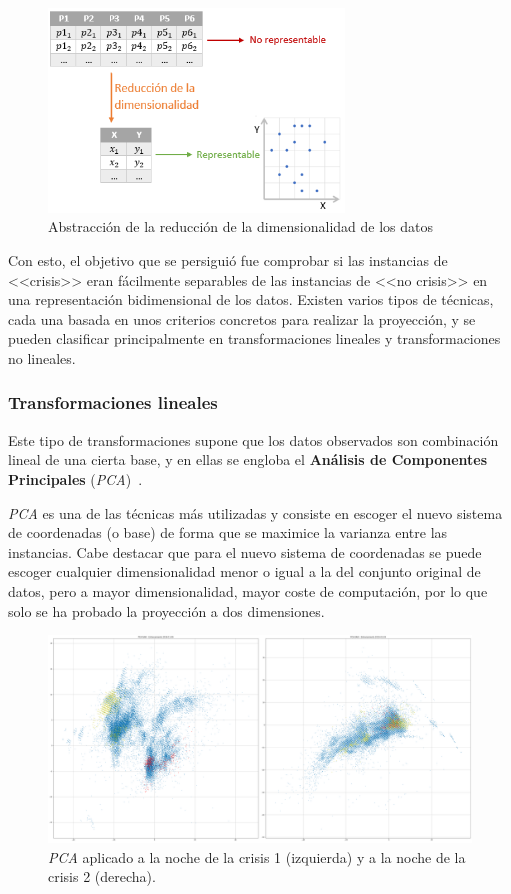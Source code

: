 \begin{figure}[H]
	\centering
	\includegraphics[width=0.7\textwidth]{../img/reducdim.png}
	\caption{Abstracción de la reducción de la dimensionalidad de los datos}
	\label{fig:reducdim}
\end{figure}


Con esto, el objetivo que se persiguió fue comprobar si las instancias de <<crisis>> eran fácilmente separables de las instancias de <<no crisis>> en una representación bidimensional de los datos. Existen varios tipos de técnicas, cada una basada en unos criterios concretos para realizar la proyección, y se pueden clasificar principalmente en transformaciones lineales y transformaciones no lineales.  

\subsubsection{Transformaciones lineales}

Este tipo de transformaciones supone que los datos observados son combinación lineal de una cierta base, y en ellas se engloba el \textbf{Análisis de Componentes Principales} (\textit{PCA})~\cite{pca}. 

\textit{PCA} es una de las técnicas más utilizadas y consiste en escoger el nuevo sistema de coordenadas (o base) de forma que se maximice la varianza entre las instancias. Cabe destacar que para el nuevo sistema de coordenadas se puede escoger cualquier dimensionalidad menor o igual a la del conjunto original de datos, pero a mayor dimensionalidad, mayor coste de computación, por lo que solo se ha probado la proyección a dos dimensiones. 

\begin{figure}[H]
	\centering
	\includegraphics[width=1\textwidth]{../img/pca.png}
	\caption{\textit{PCA} aplicado a la noche de la crisis 1 (izquierda) y a la noche de la crisis 2 (derecha).}
	\label{fig:pca}
\end{figure}

